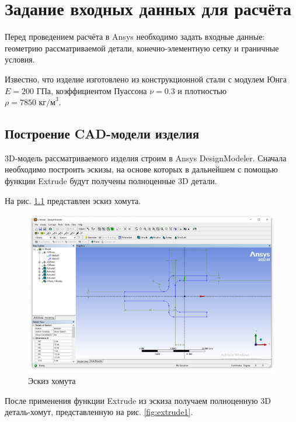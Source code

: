 \chapter{Задание входных данных для расчёта} \label{ch2}

Перед проведением расчёта в Ansys необходимо задать входные данные: геометрию рассматриваемой детали, конечно-элементную сетку и граничные условия.

Известно, что изделие изготовлено из конструкционной стали с модулем Юнга $E=200\text{ ГПа}$, коэффициентом Пуассона $\nu=0.3$ и плотностью \\ $\rho=7850\text{ кг/м}^3$.

\section{Построение CAD-модели изделия} \label{ch2:sec1}

3D-модель рассматриваемого изделия строим в Ansys DesignModeler. Сначала необходимо построить эскизы, на основе которых в дальнейшем с помощью функции Extrude будут получены полноценные 3D детали.

На рис. \ref{fig:sketch1} представлен эскиз хомута.

\begin{figure}[H] 
	\center
	\includegraphics[width=\textwidth]{images/sketch1.png}
	\caption{Эскиз хомута} 
	\label{fig:sketch1}
\end{figure}

После применения функции Extrude из эскиза получаем полноценную 3D деталь-хомут, представленную на рис. \ref{fig:extrude1}.

